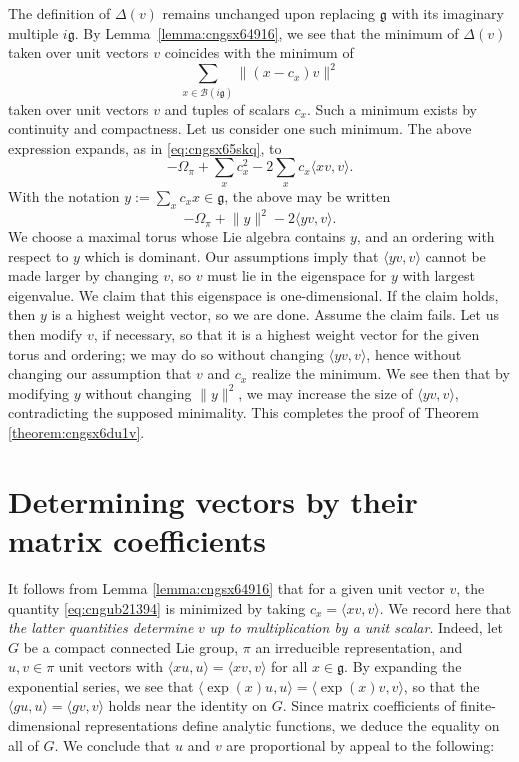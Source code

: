 \documentclass[reqno]{amsart} 
\begin{document}
The definition of $\Delta(v)$ remains unchanged upon replacing $\mathfrak{g}$ with its imaginary multiple $i \mathfrak{g}$.  By Lemma~\ref{lemma:cngsx64916}, we see that the minimum of $\Delta(v)$ taken over unit vectors $v$ coincides with the minimum of
\begin{equation}\label{eq:cngub21394}
  \sum_{x \in \mathcal{B}(i \mathfrak{g})}
  \lVert (x - c_x) v \rVert^2
\end{equation}
taken over unit vectors $v$ and tuples of scalars $c_x$.  Such a minimum exists by continuity and compactness.  Let us consider one such minimum.  The above expression expands, as in \eqref{eq:cngsx65skq}, to
\begin{equation*}
  - \Omega_\pi + \sum_x c_x^2 - 2 \sum_{x} c_x \langle x v, v \rangle.
\end{equation*}
With the notation $y := \sum_x c_x x \in \mathfrak{g}$, the above may be written
\begin{equation*}
  - \Omega_\pi + \lVert y \rVert^2 - 2 \langle y v, v \rangle.
\end{equation*}
We choose a maximal torus whose Lie algebra contains $y$, and an ordering with respect to $y$ which is dominant.  Our assumptions imply that $\langle y v, v \rangle$ cannot be made larger by changing $v$, so $v$ must lie in the eigenspace for $y$ with largest eigenvalue.  We claim that this eigenspace is one-dimensional.  If the claim holds, then $y$ is a highest weight vector, so we are done.  Assume the claim fails.  Let us then modify $v$, if necessary, so that it is a highest weight vector for the given torus and ordering; we may do so without changing $\langle y v, v \rangle$, hence without changing our assumption that $v$ and $c_x$ realize the minimum.  We see then that by modifying $y$ without changing $\lVert y \rVert^2$, we may increase the size of $\langle y v, v \rangle$, contradicting the supposed minimality.  This completes the proof of Theorem \ref{theorem:cngsx6du1v}.



\section{Determining vectors by their matrix coefficients}\label{sec:cngub4lcsx}
It follows from Lemma \ref{lemma:cngsx64916} that for a given unit vector $v$, the quantity \eqref{eq:cngub21394} is minimized by taking $c_x = \langle x v, v \rangle$.  We record here that \emph{the latter quantities determine} $v$ \emph{up to multiplication by a unit scalar}.  Indeed, let $G$ be a compact connected Lie group, $\pi$ an irreducible representation, and $u, v \in \pi$ unit vectors with $\langle x u, u \rangle = \langle x v, v \rangle$ for all $x \in \mathfrak{g}$.  By expanding the exponential series, we see that $\langle \exp(x) u, u \rangle = \langle \exp(x) v, v \rangle$, so that the
$\langle g u, u \rangle = \langle g v, v \rangle$ holds near the identity on $G$.  Since matrix coefficients of finite-dimensional representations define analytic functions, we deduce the equality on all of $G$.  We conclude that $u$ and $v$ are proportional by appeal to the following:
\end{document}
